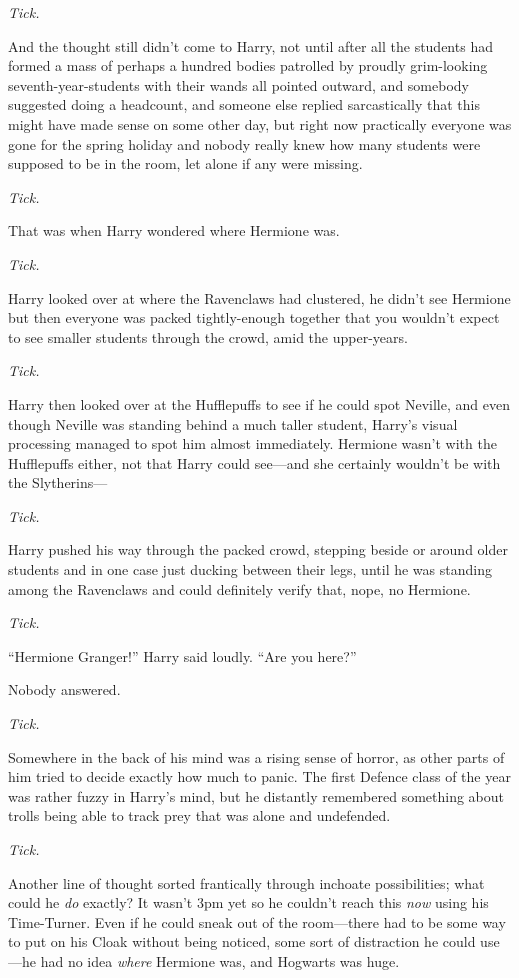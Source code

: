 \emph{Tick.}

And the thought still didn’t come to Harry, not until after all the students
had formed a mass of perhaps a hundred bodies patrolled by proudly grim-looking
seventh-year-students with their wands all pointed outward, and somebody
suggested doing a headcount, and someone else replied sarcastically that this
might have made sense on some other day, but right now practically everyone was
gone for the spring holiday and nobody really knew how many students were
supposed to be in the room, let alone if any were missing.

\emph{Tick.}

That was when Harry wondered where Hermione was.

\emph{Tick.}

Harry looked over at where the Ravenclaws had clustered, he didn’t see Hermione
but then everyone was packed tightly-enough together that you wouldn’t expect
to see smaller students through the crowd, amid the upper-years.

\emph{Tick.}

Harry then looked over at the Hufflepuffs to see if he could spot Neville, and
even though Neville was standing behind a much taller student, Harry’s visual
processing managed to spot him almost immediately. Hermione wasn’t with the
Hufflepuffs either, not that Harry could see—and she certainly wouldn’t be
with the Slytherins—

\emph{Tick.}

Harry pushed his way through the packed crowd, stepping beside or around older
students and in one case just ducking between their legs, until he was standing
among the Ravenclaws and could definitely verify that, nope, no Hermione.

\emph{Tick.}

“Hermione Granger!” Harry said loudly. “Are you here?”

Nobody answered.

\emph{Tick.}

Somewhere in the back of his mind was a rising sense of horror, as other parts
of him tried to decide exactly how much to panic. The first Defence class of
the year was rather fuzzy in Harry’s mind, but he distantly remembered
something about trolls being able to track prey that was alone and undefended.

\emph{Tick.}

Another line of thought sorted frantically through inchoate possibilities;
what could he \emph{do} exactly? It wasn’t 3pm yet so he couldn’t reach this
\emph{now} using his Time-Turner. Even if he could sneak out of the
room—there had to be some way to put on his Cloak without being noticed, some
sort of distraction he could use—he had no idea \emph{where} Hermione was,
and Hogwarts was huge.

